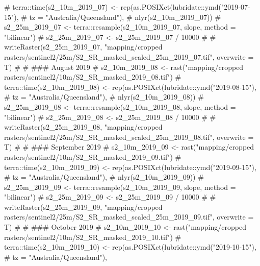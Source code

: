 \documentclass[
  letterpaper,
  DIV=11,
  numbers=noendperiod]{scrartcl}
\newenvironment{Shaded}{\begin{snugshade}}{\end{snugshade}}
\newcommand{\AlertTok}[1]{\textcolor[rgb]{0.68,0.00,0.00}{#1}}
\newcommand{\CommentTok}[1]{\textcolor[rgb]{0.37,0.37,0.37}{#1}}
\begin{document}
\begin{Shaded}
\begin{Highlighting}[]
\CommentTok{\# terra::time(s2\_10m\_2019\_07) \textless{}{-} rep(as.POSIXct(lubridate::ymd("2019{-}07{-}15"), }
\CommentTok{\#                                               tz = "Australia/Queensland"), }
\CommentTok{\#                                    nlyr(s2\_10m\_2019\_07))}
\CommentTok{\# s2\_25m\_2019\_07 \textless{}{-} terra::resample(s2\_10m\_2019\_07, slope, method = "bilinear")}
\CommentTok{\# s2\_25m\_2019\_07 \textless{}{-} s2\_25m\_2019\_07 / 10000}
\CommentTok{\# \# writeRaster(s2\_25m\_2019\_07, "mapping/cropped rasters/sentinel2/25m/S2\_SR\_masked\_scaled\_25m\_2019\_07.tif", overwrite = T)}
\CommentTok{\# }
\CommentTok{\# }\AlertTok{\#\#\#}\CommentTok{ August 2019}
\CommentTok{\# s2\_10m\_2019\_08 \textless{}{-} rast("mapping/cropped rasters/sentinel2/10m/S2\_SR\_masked\_2019\_08.tif")}
\CommentTok{\# terra::time(s2\_10m\_2019\_08) \textless{}{-} rep(as.POSIXct(lubridate::ymd("2019{-}08{-}15"), }
\CommentTok{\#                                               tz = "Australia/Queensland"), }
\CommentTok{\#                                    nlyr(s2\_10m\_2019\_08))}
\CommentTok{\# s2\_25m\_2019\_08 \textless{}{-} terra::resample(s2\_10m\_2019\_08, slope, method = "bilinear")}
\CommentTok{\# s2\_25m\_2019\_08 \textless{}{-} s2\_25m\_2019\_08 / 10000}
\CommentTok{\# \# writeRaster(s2\_25m\_2019\_08, "mapping/cropped rasters/sentinel2/25m/S2\_SR\_masked\_scaled\_25m\_2019\_08.tif", overwrite = T)}
\CommentTok{\# }
\CommentTok{\# }\AlertTok{\#\#\#}\CommentTok{ September 2019}
\CommentTok{\# s2\_10m\_2019\_09 \textless{}{-} rast("mapping/cropped rasters/sentinel2/10m/S2\_SR\_masked\_2019\_09.tif")}
\CommentTok{\# terra::time(s2\_10m\_2019\_09) \textless{}{-} rep(as.POSIXct(lubridate::ymd("2019{-}09{-}15"), }
\CommentTok{\#                                               tz = "Australia/Queensland"), }
\CommentTok{\#                                    nlyr(s2\_10m\_2019\_09))}
\CommentTok{\# s2\_25m\_2019\_09 \textless{}{-} terra::resample(s2\_10m\_2019\_09, slope, method = "bilinear")}
\CommentTok{\# s2\_25m\_2019\_09 \textless{}{-} s2\_25m\_2019\_09 / 10000}
\CommentTok{\# \# writeRaster(s2\_25m\_2019\_09, "mapping/cropped rasters/sentinel2/25m/S2\_SR\_masked\_scaled\_25m\_2019\_09.tif", overwrite = T)}
\CommentTok{\# }
\CommentTok{\# }\AlertTok{\#\#\#}\CommentTok{ October 2019}
\CommentTok{\# s2\_10m\_2019\_10 \textless{}{-} rast("mapping/cropped rasters/sentinel2/10m/S2\_SR\_masked\_2019\_10.tif")}
\CommentTok{\# terra::time(s2\_10m\_2019\_10) \textless{}{-} rep(as.POSIXct(lubridate::ymd("2019{-}10{-}15"), }
\CommentTok{\#                                               tz = "Australia/Queensland"), }

\end{Highlighting}
\end{Shaded}
\end{document}
